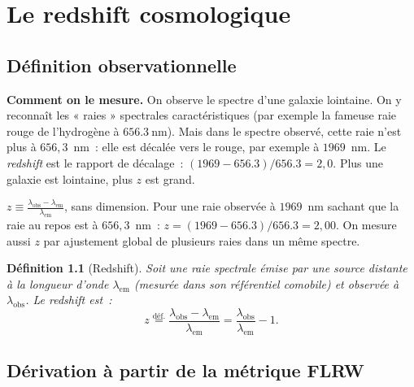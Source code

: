 \documentclass[11pt,a4paper,openany]{report}
\newcommand{\eqdef}{\stackrel{\text{déf.}}{=}}
\newtheorem{definition}[theorem]{Définition}
\begin{document}
\chapter{Le redshift cosmologique}
\label{chap:redshift}

\section{Définition observationnelle}

\begin{tcolorbox}[vulgarisation]
\textbf{Comment on le mesure.} On observe le spectre d'une galaxie lointaine.
On y reconnaît les « raies » spectrales caractéristiques (par exemple la
fameuse raie rouge de l'hydrogène à $\SI{656.3}{\nano\metre}$). Mais dans le
spectre observé, cette raie n'est plus à $656{,}3$~nm~: elle est décalée
vers le rouge, par exemple à $1969$~nm. Le \emph{redshift} est le rapport de
décalage~: $(1969-656.3)/656.3 = 2{,}0$. Plus une galaxie est lointaine, plus
$z$ est grand.
\end{tcolorbox}

\begin{tcolorbox}[mathspe]
$\displaystyle z \equiv \frac{\lambda_{\text{obs}} - \lambda_{\text{em}}}{\lambda_{\text{em}}}$,
sans dimension. Pour une raie observée à $1969$~nm sachant que la raie au repos
est à $656{,}3$~nm~: $z = (1969 - 656.3)/656.3 = 2{,}00$. On mesure aussi $z$ par
ajustement global de plusieurs raies dans un même spectre.
\end{tcolorbox}

\begin{definition}[Redshift]
Soit une raie spectrale émise par une source distante à la longueur d'onde
$\lambda_{\text{em}}$ (mesurée dans son référentiel comobile) et observée à
$\lambda_{\text{obs}}$. Le \emph{redshift} est~:
\begin{equation}
z \eqdef \frac{\lambda_{\text{obs}} - \lambda_{\text{em}}}{\lambda_{\text{em}}}
       = \frac{\lambda_{\text{obs}}}{\lambda_{\text{em}}} - 1.
\label{eq:z_def}
\end{equation}
\end{definition}

\section{Dérivation à partir de la métrique FLRW}
\end{document}
